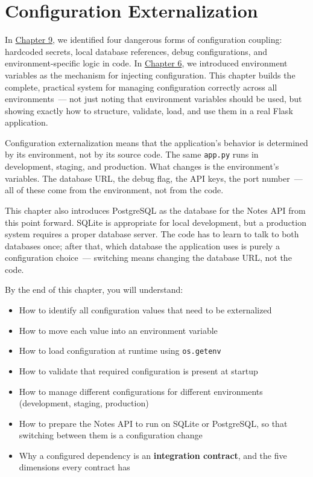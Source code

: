 \setcounter{chapter}{12}
\chapter{Configuration Externalization}\label{ch:13-configuration-externalization}

\chapterrule

In \hyperref[ch:09-configuration-coupling]{Chapter 9}, we identified four dangerous forms of configuration coupling: hardcoded secrets, local database references, debug configurations, and environment-specific logic in code. In \hyperref[ch:06-local-dependencies]{Chapter 6}, we introduced environment variables as the mechanism for injecting configuration. This chapter builds the complete, practical system for managing configuration correctly across all environments~--- not just noting that environment variables should be used, but showing exactly how to structure, validate, load, and use them in a real Flask application.

Configuration externalization means that the application's behavior is determined by its environment, not by its source code. The same \texttt{app.py} runs in development, staging, and production. What changes is the environment's variables. The database URL, the debug flag, the API keys, the port number~--- all of these come from the environment, not from the code.

This chapter also introduces PostgreSQL as the database for the Notes API from this point forward. SQLite is appropriate for local development, but a production system requires a proper database server. The code has to learn to talk to both databases once; after that, which database the application uses is purely a configuration choice~--- switching means changing the database URL, not the code.

\begin{objectives}

By the end of this chapter, you will understand:

\begin{itemize}
\tightlist
\item
  How to identify all configuration values that need to be externalized
\item
  How to move each value into an environment variable
\item
  How to load configuration at runtime using \texttt{os.getenv}
\item
  How to validate that required configuration is present at startup
\item
  How to manage different configurations for different environments (development, staging, production)
\item
  How to prepare the Notes API to run on SQLite or PostgreSQL, so that switching between them is a configuration change
\item
  Why a configured dependency is an \textbf{integration contract}, and the five dimensions every contract has
\end{itemize}

\end{objectives}

